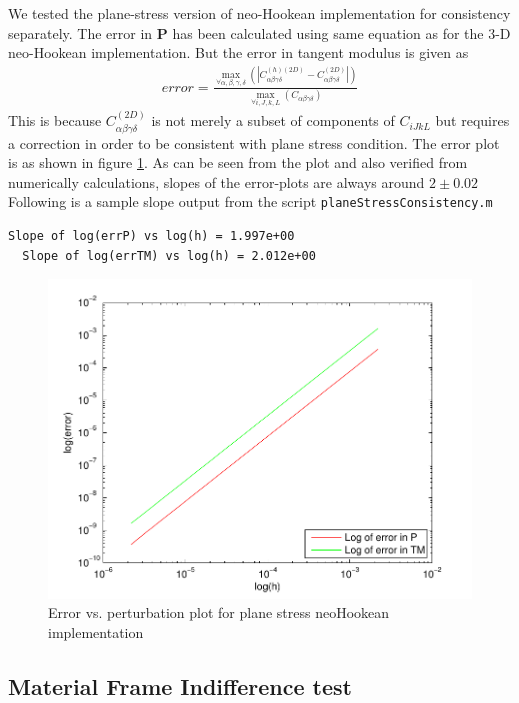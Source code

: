\message{ !name(p2.tex)}\documentclass[../main.tex]{subfiles}
\begin{document}
We tested the plane-stress version of neo-Hookean implementation for consistency separately. The error in $\mathbf{P}$ has been calculated using same equation as for the 3-D neo-Hookean implementation. But the error in tangent modulus is given as
\begin{align*}
  error =\frac{\underset{\forall \alpha,\beta,\gamma,\delta}{\max}\left(|C^{(h)(2D)}_{\alpha\beta\gamma\delta}-C^{(2D)}_{\alpha\beta\gamma\delta}|\right)}{\underset{\forall i,J,k,L}{\max}\left(C_{\alpha\beta\gamma\delta}\right)}
\end{align*}
This is because $C^{(2D)}_{\alpha\beta\gamma\delta}$ is not merely a subset of components of $C_{iJkL}$ but requires a correction in order to be consistent with plane stress condition. The error plot is as shown in figure \ref{fig:psneoHcon}. As can be seen from the plot and also verified from numerically calculations, slopes of the error-plots are always around $2\pm0.02$ Following is a sample slope output from the script \texttt{planeStressConsistency.m}
\begin{lstlisting}[frame=single]
  Slope of log(errP) vs log(h) = 1.997e+00
  Slope of log(errTM) vs log(h) = 2.012e+00
\end{lstlisting}
\begin{figure}[h]
  \centering
  \includegraphics{./img/planeStressConsistency.pdf}  
  \caption{Error vs. perturbation plot for plane stress neoHookean implementation}
  \label{fig:psneoHcon}
\end{figure}

\subsection{Material Frame Indifference test}
\end{document}

